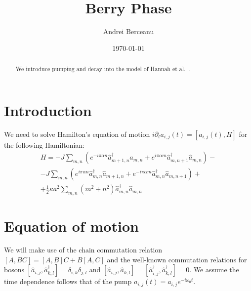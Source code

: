 \documentclass[a4paper,prb,10pt,aps,twocolumn]{revtex4-1}
\begin{document}
\title{Berry Phase}
\author{Andrei Berceanu}

\date{\today}

\begin{abstract}
We introduce pumping and decay into the model of Hannah et al.~\cite{1403.6041v2}.
\end{abstract}

\maketitle

\section{Introduction}
We need to solve Hamilton's equation of motion $i\partial_{t}a_{i,j}(t)=\left[a_{i,j}(t),H\right]$ for the following Hamiltonian:\cite{1403.6041v2} 
\begin{multline}
  \label{eq:1}
H=-J\sum_{m,n}(e^{-i\pi\alpha n}\hat{a}_{m+1,n}^{\dagger}\hat{a}_{m,n}+e^{i\pi\alpha m}\hat{a}_{m,n+1}^{\dagger}\hat{a}_{m,n})-\\-J\sum_{m,n}(e^{i\pi\alpha n}\hat{a}_{m,n}^{\dagger}\hat{a}_{m+1,n}+e^{-i\pi\alpha m}\hat{a}_{m,n}^{\dagger}\hat{a}_{m,n+1})+\\+\frac{1}{2}\kappa a^{2}\sum_{m,n}(m^{2}+n^{2})\hat{a}_{m,n}^{\dagger}\hat{a}_{m,n}
\end{multline}


\section{Equation of motion}

We will make use of the chain commutation relation $\left[A,BC\right]=\left[A,B\right]C+B\left[A,C\right]$ and the well-known commutation relations for bosons $\left[\hat{a}_{i,j},\hat{a}_{k,l}^{\dagger}\right]=\delta_{i,k}\delta_{j,l}$ and $\left[\hat{a}_{i,j},\hat{a}_{k,l}\right]=\left[\hat{a}_{i,j}^{\dagger},\hat{a}_{k,l}^{\dagger}\right]=0$. We assume the time dependence follows that of the pump $a_{i,j}(t)=a_{i,j}e^{-i\omega_{0}t}$.
\end{document}
